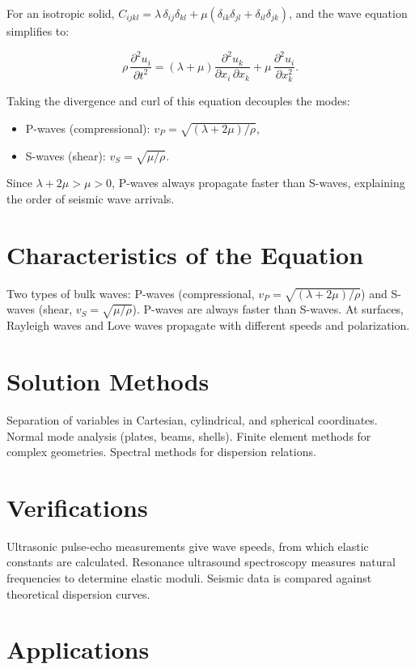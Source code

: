 For an isotropic solid, $C_{ijkl} = \lambda\,\delta_{ij}\delta_{kl} + \mu(\delta_{ik}\delta_{jl} + \delta_{il}\delta_{jk})$, and the wave equation simplifies to:

\begin{equation}
\rho\,\frac{\partial^2 u_i}{\partial t^2} = (\lambda + \mu)\frac{\partial^2 u_k}{\partial x_i\,\partial x_k} + \mu\,\frac{\partial^2 u_i}{\partial x_k^2}.
\end{equation}

Taking the divergence and curl of this equation decouples the modes:

\begin{itemize}
\item P-waves (compressional): $v_P = \sqrt{(\lambda + 2\mu)/\rho}$,
\item S-waves (shear): $v_S = \sqrt{\mu/\rho}$.
\end{itemize}

Since $\lambda + 2\mu > \mu > 0$, P-waves always propagate faster than S-waves, explaining the order of seismic wave arrivals.

\section*{Characteristics of the Equation}

Two types of bulk waves: P-waves (compressional, $v_P = \sqrt{(\lambda + 2\mu)/\rho}$) and S-waves (shear, $v_S = \sqrt{\mu/\rho}$). P-waves are always faster than S-waves. At surfaces, Rayleigh waves and Love waves propagate with different speeds and polarization.
\section*{Solution Methods}

Separation of variables in Cartesian, cylindrical, and spherical coordinates. Normal mode analysis (plates, beams, shells). Finite element methods for complex geometries. Spectral methods for dispersion relations.
\section*{Verifications}

Ultrasonic pulse-echo measurements give wave speeds, from which elastic constants are calculated. Resonance ultrasound spectroscopy measures natural frequencies to determine elastic moduli. Seismic data is compared against theoretical dispersion curves.
\section*{Applications}

